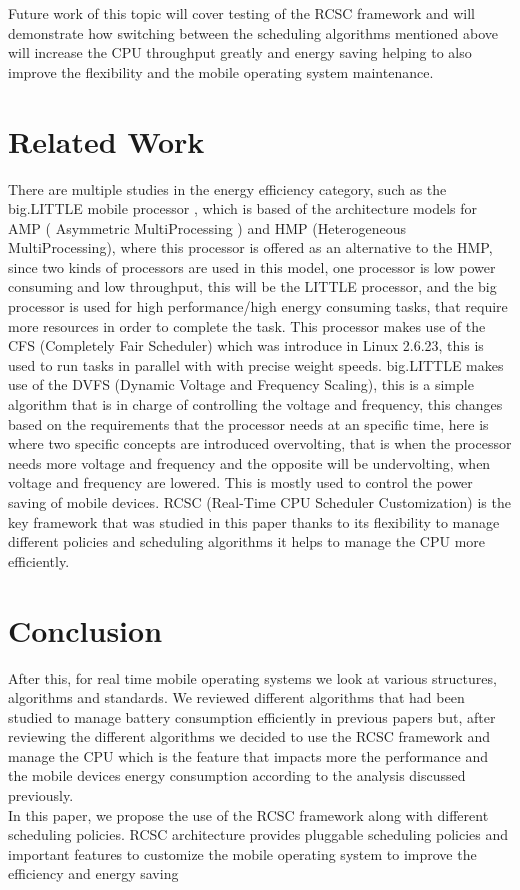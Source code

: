 \documentclass[conference]{IEEEtran}
\begin{document}
Future work of this topic will cover testing of the RCSC framework and will demonstrate how switching between the scheduling algorithms mentioned above will increase the CPU throughput greatly and energy saving helping to also improve the flexibility and the mobile operating system maintenance. 

\section{Related Work}

There are multiple studies in the energy efficiency category, such as the big.LITTLE mobile processor \cite{KISO01}, which is based of the architecture models for AMP ( Asymmetric MultiProcessing ) and HMP (Heterogeneous MultiProcessing), where this processor is offered as an alternative to the HMP, since two kinds of processors are used in this model, one processor is low power consuming and low throughput, this will be the LITTLE processor, and the big processor is used for high performance/high energy consuming tasks, that require more resources in order to complete the task.
This processor makes use of the CFS (Completely Fair Scheduler) which was introduce in Linux 2.6.23, this is used to run tasks in parallel with with precise weight speeds. 
big.LITTLE makes use of the DVFS (Dynamic Voltage and Frequency Scaling), this is a simple algorithm that is in charge of controlling the voltage and frequency, this changes based on the requirements that the processor needs at an specific time, here is where two specific concepts are introduced overvolting, that is when the processor needs more voltage and frequency and the opposite will be undervolting, when voltage and frequency are lowered. This is mostly used to control the power saving of mobile devices. RCSC (Real-Time CPU Scheduler Customization) \cite{ALMA01} is the key framework that was studied in this paper thanks to its flexibility to manage different policies and scheduling algorithms it helps to manage the CPU more efficiently.

\section{Conclusion}
After this, for real time mobile operating systems we look at various structures, algorithms and standards. We reviewed different algorithms that had been studied to manage battery consumption efficiently  in previous papers but, after reviewing the different algorithms we decided to use the RCSC framework and manage the CPU which is the feature that impacts more the performance and the mobile devices energy consumption according to the analysis discussed previously. \\
In this paper, we propose the use of the RCSC framework along with different scheduling policies. RCSC architecture provides pluggable scheduling policies and important features to customize the mobile operating system to improve the efficiency and energy saving

\nocite{*}



\end{document}

